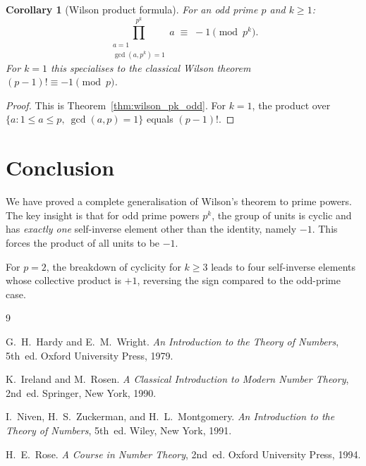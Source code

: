\documentclass[12pt,a4paper]{amsart}
\newtheorem{corollary}[theorem]{Corollary}
\theoremstyle{definition}
\begin{document}
\begin{corollary}[Wilson product formula]\label{cor:wilson_formula}
  For an odd prime $p$ and $k \geq 1$:
  \[
    \prod_{\substack{a=1\\\gcd(a,p^k)=1}}^{p^k} a \;\equiv\; -1 \pmod{p^k}.
  \]
  For $k = 1$ this specialises to the classical Wilson theorem $(p-1)! \equiv -1 \pmod p$.
\end{corollary}

\begin{proof}
  This is Theorem~\ref{thm:wilson_pk_odd}.  For $k = 1$, the product over
  $\{a : 1 \leq a \leq p,\ \gcd(a,p) = 1\}$ equals $(p-1)!$.
\end{proof}

\section{Conclusion}

We have proved a complete generalisation of Wilson's theorem to prime powers.
The key insight is that for odd prime powers $p^k$, the group of units is
cyclic and has \emph{exactly one} self-inverse element other than the identity,
namely $-1$.  This forces the product of all units to be $-1$.

For $p = 2$, the breakdown of cyclicity for $k \geq 3$ leads to four
self-inverse elements whose collective product is $+1$, reversing the sign
compared to the odd-prime case.

\begin{thebibliography}{9}

G.~H.~Hardy and E.~M.~Wright.
\newblock \emph{An Introduction to the Theory of Numbers}, 5th~ed.
\newblock Oxford University Press, 1979.

K.~Ireland and M.~Rosen.
\newblock \emph{A Classical Introduction to Modern Number Theory}, 2nd~ed.
\newblock Springer, New York, 1990.

I.~Niven, H.~S.~Zuckerman, and H.~L.~Montgomery.
\newblock \emph{An Introduction to the Theory of Numbers}, 5th~ed.
\newblock Wiley, New York, 1991.

H.~E.~Rose.
\newblock \emph{A Course in Number Theory}, 2nd~ed.
\newblock Oxford University Press, 1994.

\end{thebibliography}
\end{document}
